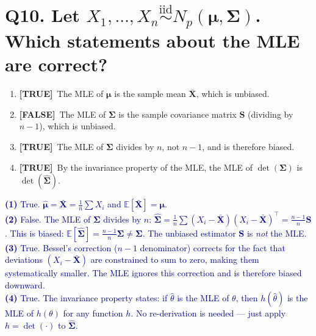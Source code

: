 \documentclass[12pt, a4paper]{article}
\newcommand{\T}{\textcolor{truegreen}{\textbf{[TRUE]}}}
\newcommand{\F}{\textcolor{falsered}{\textbf{[FALSE]}}}
\newcommand{\expl}[1]{\textcolor{darkblue}{\small #1}}
\begin{document}
\vspace{1.5em}

\section*{Q10. Let $X_1, \ldots, X_n \overset{\mathrm{iid}}{\sim} N_p(\boldsymbol{\mu}, \boldsymbol{\Sigma})$. Which statements about the MLE are correct?}

\begin{enumerate}[label=(\arabic*)]
  \item \T\ The MLE of $\boldsymbol{\mu}$ is the sample mean $\bar{\mathbf{X}}$, which is unbiased.
  \item \F\ The MLE of $\boldsymbol{\Sigma}$ is the sample covariance matrix $\mathbf{S}$ (dividing by $n-1$), which is unbiased.
  \item \T\ The MLE of $\boldsymbol{\Sigma}$ divides by $n$, not $n-1$, and is therefore biased.
  \item \T\ By the invariance property of the MLE, the MLE of $\det(\boldsymbol{\Sigma})$ is $\det(\hat{\boldsymbol{\Sigma}})$.
\end{enumerate}

\expl{
\textbf{(1)} True. $\hat{\boldsymbol{\mu}} = \bar{\mathbf{X}} = \frac{1}{n}\sum X_i$ and $\mathbb{E}[\bar{\mathbf{X}}] = \boldsymbol{\mu}$.\\
\textbf{(2)} False. The MLE of $\boldsymbol{\Sigma}$ divides by $n$: $\hat{\boldsymbol{\Sigma}} = \frac{1}{n}\sum (X_i - \bar{\mathbf{X}})(X_i - \bar{\mathbf{X}})^\top = \frac{n-1}{n}\mathbf{S}$. This is biased: $\mathbb{E}[\hat{\boldsymbol{\Sigma}}] = \frac{n-1}{n}\boldsymbol{\Sigma} \neq \boldsymbol{\Sigma}$. The unbiased estimator $\mathbf{S}$ is \textit{not} the MLE.\\
\textbf{(3)} True. Bessel's correction ($n-1$ denominator) corrects for the fact that deviations $(X_i - \bar{\mathbf{X}})$ are constrained to sum to zero, making them systematically smaller. The MLE ignores this correction and is therefore biased downward.\\
\textbf{(4)} True. The invariance property states: if $\hat{\theta}$ is the MLE of $\theta$, then $h(\hat{\theta})$ is the MLE of $h(\theta)$ for any function $h$. No re-derivation is needed — just apply $h = \det(\cdot)$ to $\hat{\boldsymbol{\Sigma}}$.
}

\vspace{1.5em}
\end{document}
